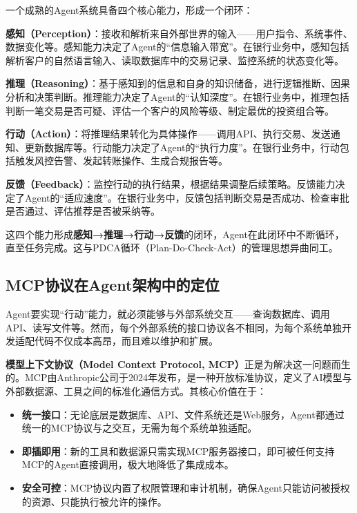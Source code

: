 一个成熟的Agent系统具备四个核心能力，形成一个闭环：

\textbf{感知（Perception）}：接收和解析来自外部世界的输入——用户指令、系统事件、数据变化等。感知能力决定了Agent的``信息输入带宽''。在银行业务中，感知包括解析客户的自然语言输入、读取数据库中的交易记录、监控系统的状态变化等。

\textbf{推理（Reasoning）}：基于感知到的信息和自身的知识储备，进行逻辑推断、因果分析和决策判断。推理能力决定了Agent的``认知深度''。在银行业务中，推理包括判断一笔交易是否可疑、评估一个客户的风险等级、制定最优的投资组合等。

\textbf{行动（Action）}：将推理结果转化为具体操作——调用API、执行交易、发送通知、更新数据库等。行动能力决定了Agent的``执行力度''。在银行业务中，行动包括触发风控告警、发起转账操作、生成合规报告等。

\textbf{反馈（Feedback）}：监控行动的执行结果，根据结果调整后续策略。反馈能力决定了Agent的``适应速度''。在银行业务中，反馈包括判断交易是否成功、检查审批是否通过、评估推荐是否被采纳等。

这四个能力形成\textbf{感知→推理→行动→反馈}的闭环，Agent在此闭环中不断循环，直至任务完成。这与PDCA循环（Plan-Do-Check-Act）的管理思想异曲同工。

\subsection{MCP协议在Agent架构中的定位}

Agent要实现``行动''能力，就必须能够与外部系统交互——查询数据库、调用API、读写文件等。然而，每个外部系统的接口协议各不相同，为每个系统单独开发适配代码不仅成本高昂，而且难以维护和扩展。

\textbf{模型上下文协议（Model Context Protocol, MCP）}正是为解决这一问题而生的。MCP由Anthropic公司于2024年发布，是一种开放标准协议，定义了AI模型与外部数据源、工具之间的标准化通信方式。其核心价值在于：

\begin{itemize}[leftmargin=2em]
  \item \textbf{统一接口}：无论底层是数据库、API、文件系统还是Web服务，Agent都通过统一的MCP协议与之交互，无需为每个系统单独适配。
  \item \textbf{即插即用}：新的工具和数据源只需实现MCP服务器接口，即可被任何支持MCP的Agent直接调用，极大地降低了集成成本。
  \item \textbf{安全可控}：MCP协议内置了权限管理和审计机制，确保Agent只能访问被授权的资源、只能执行被允许的操作。
\end{itemize}

